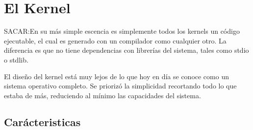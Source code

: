\chapter{El Kernel}
SACAR:En su más simple escencia es simplemente todos los kernels un código ejecutable, el cual es generado con un compilador como cualquier otro. La diferencia es que no tiene dependencias con librerías del sistema, tales como stdio o stdlib.


El diseño del kernel está muy lejos de lo que hoy en día se conoce como un sistema operativo completo. Se priorizó la simplicidad recortando todo lo que estaba de más, reduciendo al mínimo las capacidades del sistema. 

\section{Carácteristicas}

